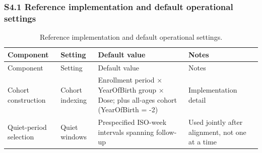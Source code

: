 \documentclass[
]{article}
\begin{document}
\subsubsection{S4.1 Reference implementation and default operational settings}\label{s4.1-reference-implementation-and-default-operational-settings}

\begin{longtable}[]{@{}
  >{\raggedright\arraybackslash}p{}
  >{\raggedright\arraybackslash}p{}
  >{\raggedright\arraybackslash}p{}
  >{\raggedright\arraybackslash}p{}@{}}
\caption{Reference implementation and default operational settings.}\label{tbl:si_defaults}\tabularnewline
\toprule\noalign{}
\begin{minipage}[b]{\linewidth}\raggedright
Component
\end{minipage} & \begin{minipage}[b]{\linewidth}\raggedright
Setting
\end{minipage} & \begin{minipage}[b]{\linewidth}\raggedright
Default value
\end{minipage} & \begin{minipage}[b]{\linewidth}\raggedright
Notes
\end{minipage} \\
\midrule\noalign{}
\endfirsthead
\toprule\noalign{}
\begin{minipage}[b]{\linewidth}\raggedright
Component
\end{minipage} & \begin{minipage}[b]{\linewidth}\raggedright
Setting
\end{minipage} & \begin{minipage}[b]{\linewidth}\raggedright
Default value
\end{minipage} & \begin{minipage}[b]{\linewidth}\raggedright
Notes
\end{minipage} \\
\midrule\noalign{}
\endhead
\bottomrule\noalign{}
\endlastfoot
Cohort construction & Cohort indexing & Enrollment period × YearOfBirth group × Dose; plus all-ages cohort (YearOfBirth = -2) & Implementation detail \\
Quiet-period selection & Quiet windows & Prespecified ISO-week intervals spanning follow-up & Used jointly after alignment, not one at a time \\

\end{longtable}
\end{document}
